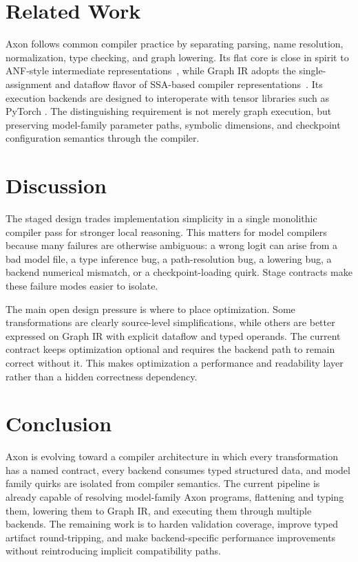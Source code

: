 \documentclass{article}
\providecommand{\citep}[1]{\cite{#1}}
\begin{document}
\section{Related Work}

Axon follows common compiler practice by separating parsing, name resolution,
normalization, type checking, and graph lowering.  Its flat core is close in
spirit to ANF-style intermediate representations~\citep{sabry1992anf}, while
Graph IR adopts the single-assignment and dataflow flavor of SSA-based
compiler representations~\citep{cytron1991ssa}.  Its execution backends are
designed to interoperate with tensor libraries such as PyTorch
\citep{paszke2019pytorch}.  The distinguishing requirement is not merely graph
execution, but preserving model-family parameter paths, symbolic dimensions,
and checkpoint configuration semantics through the compiler.

\section{Discussion}

The staged design trades implementation simplicity in a single monolithic
compiler pass for stronger local reasoning.  This matters for model compilers
because many failures are otherwise ambiguous: a wrong logit can arise from a
bad model file, a type inference bug, a path-resolution bug, a lowering bug, a
backend numerical mismatch, or a checkpoint-loading quirk.  Stage contracts
make these failure modes easier to isolate.

The main open design pressure is where to place optimization.  Some
transformations are clearly source-level simplifications, while others are
better expressed on Graph IR with explicit dataflow and typed operands.  The
current contract keeps optimization optional and requires the backend path to
remain correct without it.  This makes optimization a performance and
readability layer rather than a hidden correctness dependency.

\section{Conclusion}

Axon is evolving toward a compiler architecture in which every transformation
has a named contract, every backend consumes typed structured data, and model
family quirks are isolated from compiler semantics.  The current pipeline is
already capable of resolving model-family Axon programs, flattening and typing
them, lowering them to Graph IR, and executing them through multiple backends.
The remaining work is to harden validation coverage, improve typed artifact
round-tripping, and make backend-specific performance improvements without
reintroducing implicit compatibility paths.



\end{document}
